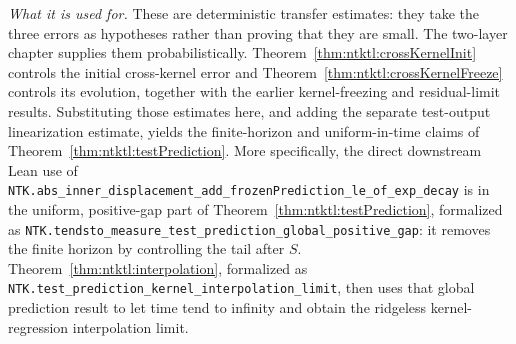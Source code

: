 \begin{remark}
\emph{What it is used for.} These are deterministic transfer estimates: they take the three errors
as hypotheses rather than proving that they are small. The two-layer chapter supplies them
probabilistically. Theorem~\ref{thm:ntktl:crossKernelInit} controls the initial cross-kernel error
and Theorem~\ref{thm:ntktl:crossKernelFreeze} controls its evolution, together with the earlier
kernel-freezing and residual-limit results. Substituting those estimates here, and adding the
separate test-output linearization estimate, yields the finite-horizon and uniform-in-time claims
of Theorem~\ref{thm:ntktl:testPrediction}. More specifically, the direct downstream Lean use of
\texttt{NTK.abs\_inner\_displacement\_add\_frozenPrediction\_le\_of\_exp\_decay} is in
the uniform, positive-gap part of Theorem~\ref{thm:ntktl:testPrediction}, formalized as
\texttt{NTK.tendsto\_measure\_test\_prediction\_global\_positive\_gap}: it removes the finite
horizon by controlling the tail after $S$. Theorem~\ref{thm:ntktl:interpolation}, formalized as
\texttt{NTK.test\_prediction\_kernel\_interpolation\_limit}, then uses that global prediction
result to let time tend to infinity and obtain the ridgeless kernel-regression interpolation limit.
\end{remark}

